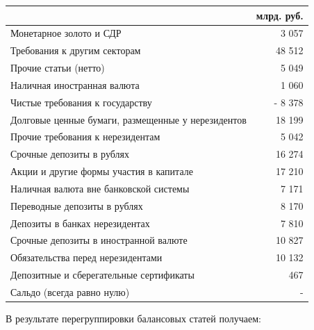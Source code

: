 \documentclass[12pt, table, a4paper,twoside]{exam}
\begin{document}
\begin{questions}
\begin{tabularx}{\linewidth}[b]{@{}>{\raggedright\arraybackslash}Xr@{}}				& млрд. руб.\\
	\toprule
	Монетарное золото и СДР &                 3 057    \\
	Требования к другим секторам &               48 512    \\
	Прочие статьи (нетто) &                 5 049    \\
	Наличная иностранная валюта &                 1 060    \\
	Чистые требования к государству & -              8 378    \\
	Долговые ценные бумаги, размещенные у нерезидентов &               18 199    \\
	Прочие требования к нерезидентам &                 5 042    \\
	Срочные депозиты в рублях &               16 274    \\
	Акции и другие формы участия в капитале &               17 210    \\
	Наличная валюта вне банковской системы &                 7 171    \\
	Переводные депозиты в рублях &                 8 170    \\
	Депозиты в банках нерезидентах &                 7 810    \\
	Срочные депозиты в иностранной валюте &               10 827    \\
	Обязательства перед нерезидентами &               10 132    \\
	Депозитные и сберегательные сертификаты &                   467    \\
	Сальдо (всегда равно нулю) &                      -      \\
	\bottomrule
\end{tabularx}%

\vfill\null\pagebreak
\begin{solution}[12em] В результате перегруппировки балансовых статей получаем:
	

\end{solution}
\end{questions}
\end{document}
